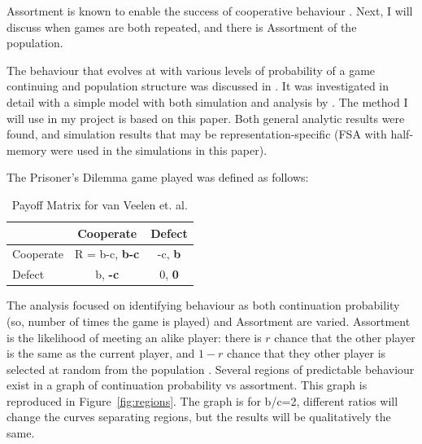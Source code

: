 \documentclass[a4paper,11pt,bcshonoursthesis,singlespace,oneside,thesisdraft,pdflatex]{cssethesis}
\begin{document}
Assortment is known to enable the success of cooperative behaviour \citep{bergstrom2003algebra}. 
Next, I will discuss when games are both repeated, and there is Assortment of the population.

The behaviour that evolves at with various levels of probability of a game continuing and population structure was discussed in \citet{axelrod:Science:1981}. It was investigated in detail with a simple model with both simulation and analysis by \citet{van-veelen:PNAS:2012}.
The method I will use in my project is based on this paper. 
Both general analytic results were found, and simulation results that may be representation-specific (FSA with half-memory were used in the simulations in this paper). 

The Prisoner's Dilemma game played was defined as follows:
\begin{table}[h]\centering
\captionsetup{justification=centering}
\begin{tabular}{|l|c|c|}
\hline
 & \bf{Cooperate} & \bf{Defect}\\
\hline
Cooperate & R = b-c, \bf{b-c} & -c, \bf{b}\\
\hline
Defect & b, \bf{-c}  & 0, \bf{0} \\
\hline
\end{tabular}
\caption{Payoff Matrix for van Veelen et. al.}
\label{table:directReciprocity}
\end{table}

The analysis focused on identifying behaviour as both continuation probability (so, number of times the game is played) and Assortment are varied. Assortment is the likelihood of meeting an alike player: there is $r$ chance that the other player is the same as the current player, and $1-r$ chance that they other player is selected at random from the population \citep{eshel:PNAS:1982}. Several regions of predictable behaviour exist in a graph of continuation probability vs assortment. This graph is reproduced in Figure~\ref{fig:regions}. The graph is for b/c=2, different ratios will change the curves separating regions, but the results will be qualitatively the same. 
\end{document}
